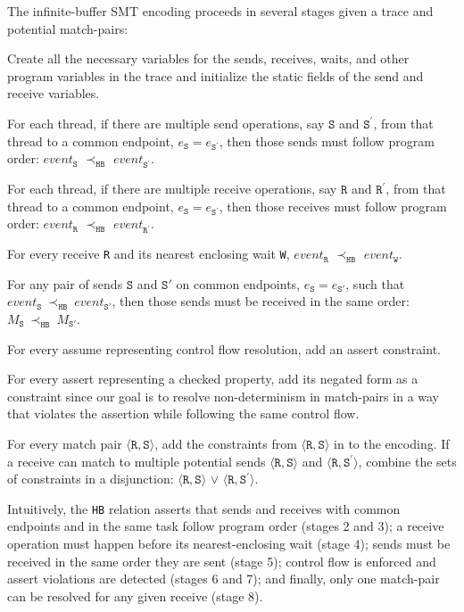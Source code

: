 The infinite-buffer SMT encoding proceeds in several stages given a trace and potential match-pairs:
\begin{compactenum}
\item Create all the necessary variables for the sends, receives, waits, and other program variables in the trace and initialize the static fields of the send and receive variables.
\item For each thread, if there are multiple send operations, say $\mathtt{S}$ and $\mathtt{S^\prime}$, from that thread to a common endpoint, $e_\mathtt{S} = e_\mathtt{S^\prime}$, then those sends must follow program order: $\mathit{event}_\mathtt{S}$ $\prec_\mathtt{HB}$ $\mathit{event}_\mathtt{S^\prime}$.
\item For each thread, if there are multiple receive operations, say $\mathtt{R}$ and $\mathtt{R^\prime}$, from that thread to a common endpoint, $e_\mathtt{S} = e_\mathtt{S^\prime}$, then those receives must follow program order: $\mathit{event}_\mathtt{R}$ $\prec_\mathtt{HB}$ $\mathit{event}_\mathtt{R^\prime}$.
\item For every receive \texttt{R} and its nearest enclosing wait \texttt{W}, $\mathit{event}_\mathtt{R}$ $\prec_\mathtt{HB}$ $\mathit{event}_\mathtt{W}$.
\item For any pair of sends $\mathtt{S}$ and $\mathtt{S'}$ on common endpoints, $e_{\mathtt{S}}=e_{\mathtt{S'}}$, such that $\mathit{event}_\mathtt{S}\ \mathrm{\prec_\mathtt{HB}}\ \mathit{event}_\mathtt{S'}$, then those sends must be received in the same order: $M_{\mathtt{S}}\ \mathrm{\prec_{\mathtt{HB}}}\ M_{\mathtt{S'}}$.
\item For every assume representing control flow resolution, add an assert constraint.
\item For every assert representing a checked property, add its negated form as a constraint since our goal is to resolve non-determinism in match-pairs in a way that violates the assertion while following the same control flow.
\item For every match pair $\langle\mathtt{R}, \mathtt{S}\rangle$, add the constraints from $\langle\mathtt{R}, \mathtt{S}\rangle$ in  to the encoding. If a receive can match to multiple potential sends $\langle\mathtt{R}, \mathtt{S}\rangle$ and $\langle\mathtt{R}, \mathtt{S^\prime}\rangle$, combine the sets of constraints in a disjunction: $\langle\mathtt{R}, \mathtt{S}\rangle$ $\vee$ $\langle\mathtt{R}, \mathtt{S^\prime}\rangle$.
\end{compactenum}
Intuitively, the \texttt{HB} relation asserts that sends and receives
with common endpoints and in the same task follow program order
(stages 2 and 3); a receive operation must happen before its
nearest-enclosing wait (stage 4); sends must be received in the same
order they are sent (stage 5); control flow is enforced and assert
violations are detected (stages 6 and 7); and finally, only one
match-pair can be resolved for any given receive (stage 8).

